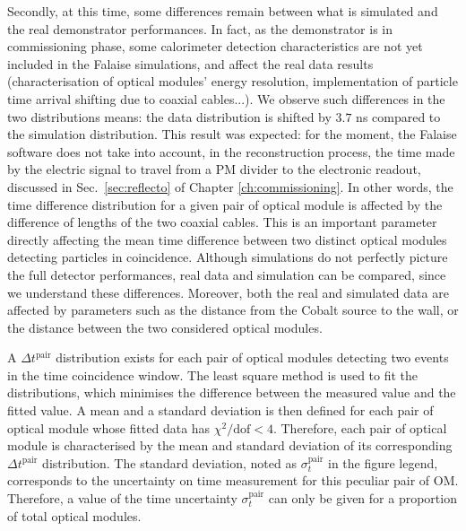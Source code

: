 Secondly, at this time, some differences remain between what is simulated and the real demonstrator performances.
In fact, as the demonstrator is in commissioning phase, some calorimeter detection characteristics are not yet included in the Falaise simulations, and affect the real data results (characterisation of optical modules' energy resolution, implementation of particle time arrival shifting due to coaxial cables...).
We observe such differences in the two distributions means: the data distribution is shifted by $3.7$ ns compared to the simulation distribution.
This result was expected: for the moment, the Falaise software does not take into account, in the reconstruction process, the time made by the electric signal to travel from a PM divider to the electronic readout, discussed in Sec.~\ref{sec:reflecto} of Chapter \ref{ch:commissioning}.
In other words, the time difference distribution for a given pair of optical module is affected by the difference of lengths of the two coaxial cables.
This is an important parameter directly affecting the mean time difference between two distinct optical modules detecting particles in coincidence.
Although simulations do not perfectly picture the full detector performances, real data and simulation can be compared, since we understand these differences.
Moreover, both the real and simulated data are affected by parameters such as the distance from the Cobalt source to the wall, or the distance between the two considered optical modules.

A $\Delta t^{\text{pair}}$ distribution exists for each pair of optical modules detecting two events in the time coincidence window.
The least square method is used to fit the distributions, which minimises the difference between the measured value and the fitted value.
A mean and a standard deviation is then defined for each pair of optical module whose fitted data has $\chi^{2}/\text{dof}<4$.
Therefore, each pair of optical module is characterised by the mean and standard deviation of its corresponding $\Delta t^{\text{pair}}$ distribution.
The standard deviation, noted as $\sigma_{t}^{\text{pair}}$ in the figure legend, corresponds to the uncertainty on time measurement for this peculiar pair of OM.
Therefore, a value of the time uncertainty $\sigma_{t}^{\text{pair}}$ can only be given for a proportion of total optical modules.

